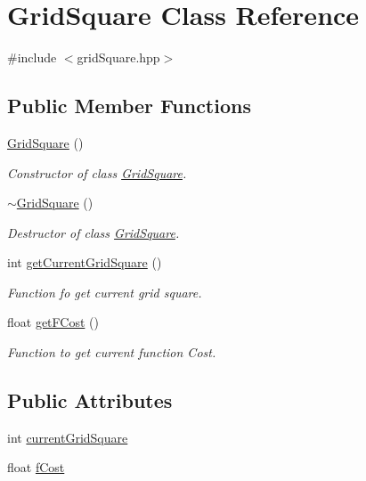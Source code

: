 \hypertarget{class_grid_square}{}\section{Grid\+Square Class Reference}
\label{class_grid_square}


{\ttfamily \#include $<$grid\+Square.\+hpp$>$}

\subsection*{Public Member Functions}
\begin{DoxyCompactItemize}
\item 
\hyperlink{class_grid_square_a88fe5e8a65dec8e59dde719e4a99b043}{Grid\+Square} ()
\begin{DoxyCompactList}\small\item\em Constructor of class \hyperlink{class_grid_square}{Grid\+Square}. \end{DoxyCompactList}\item 
\hyperlink{class_grid_square_a59667a543b4501774304ea25d8cd5589}{$\sim$\+Grid\+Square} ()
\begin{DoxyCompactList}\small\item\em Destructor of class \hyperlink{class_grid_square}{Grid\+Square}. \end{DoxyCompactList}\item 
int \hyperlink{class_grid_square_acea2649a57dd575402c2366de18cd9a8}{get\+Current\+Grid\+Square} ()
\begin{DoxyCompactList}\small\item\em Function fo get current grid square. \end{DoxyCompactList}\item 
float \hyperlink{class_grid_square_a6e82cc70c531d6a2fede8dadb3cd1e02}{get\+F\+Cost} ()
\begin{DoxyCompactList}\small\item\em Function to get current function Cost. \end{DoxyCompactList}\end{DoxyCompactItemize}
\subsection*{Public Attributes}
\begin{DoxyCompactItemize}
\item 
int \hyperlink{class_grid_square_af62396d0127126d7f95a81f81f4bc833}{current\+Grid\+Square}
\item 
float \hyperlink{class_grid_square_a9d04f5503abd3663e7496dc6c3a702c0}{f\+Cost}
\end{DoxyCompactItemize}


